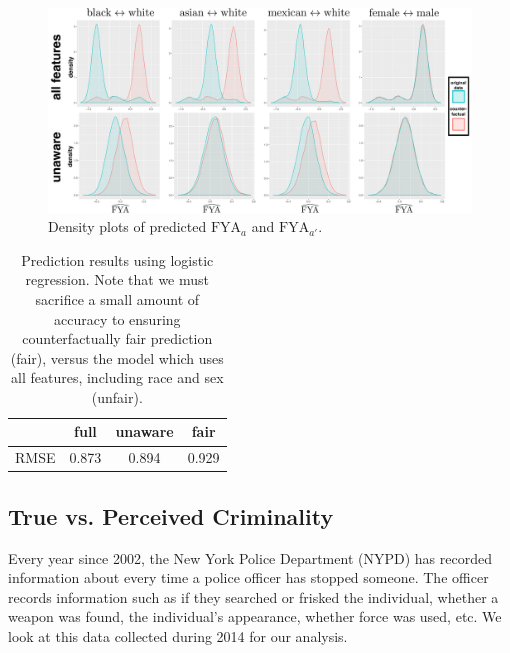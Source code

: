 \begin{figure}[th]
\begin{center}
 \label{figure.counterfactual}
\vspace{-1ex}
\centerline{\includegraphics[width=\columnwidth]{counterfactual}}
\vspace{-2ex}
\caption{Density plots of predicted $\mbox{FYA}_a$ and $\mbox{FYA}_{a'}$.}
\vspace{-2ex}
\end{center}
\end{figure}


\begin{table}[t]
\vspace{-2ex}
\caption{Prediction results using logistic regression. Note that we must sacrifice a small amount of accuracy to ensuring counterfactually fair prediction (fair), versus the model which uses all features, including race and sex (unfair).}
\vspace{-3ex}
\label{table.pred_law}
\begin{center}
\resizebox{\columnwidth}{!}
{
\begin{sc}
\footnotesize
\begin{tabular}{c|c|c|c}
\hline
\hline
& full & unaware  & fair  \\
\hline
RMSE & 0.873 & 0.894  & 0.929 \\ \hline
\end{tabular}
\end{sc}
}
\end{center}
\vspace{-4ex}
\end{table}


\subsection{True vs. Perceived Criminality}
Every year since 2002, the New York Police Department (NYPD) has recorded information about every time a police officer has stopped someone. The officer records information such as if they searched or frisked the individual, whether a weapon was found, the individual's appearance, whether force was used, etc. We look at this data collected during 2014 for our analysis.


